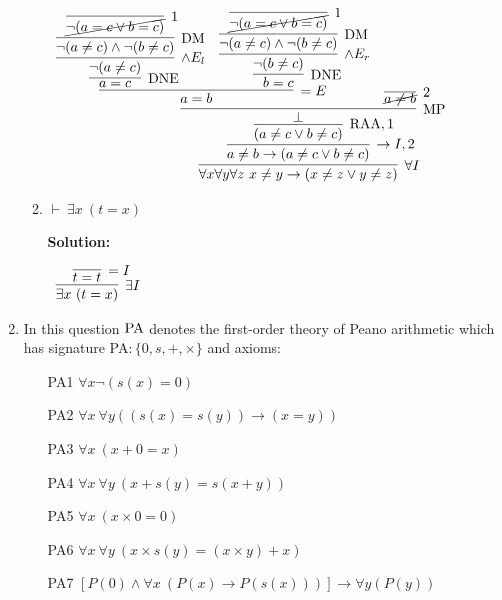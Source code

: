\documentclass[11pt]{report}
\begin{document}
\begin{enumerate}
\begin{enumerate}
		\begin{mdframed}
			\begin{center}
				$\begin{array}{c}
					\infer[\forall I]{\forall x \forall y \forall z \ x \neq y \to (x \neq z \lor y \neq z)}
						{\infer[\to I,2]{a \neq b \to (a \neq c \lor b \neq c)}
							{\infer[\RAA,1]{(a \neq c \lor b \neq c)}
								{\infer[\MP]{\bot}
										{\infer[=E]{a = b}
											{\infer[\DNE]{a=c}
												{\infer[\land E_{l}]{\lnot(a \neq c)}
													{\infer[\DM]{\lnot(a \neq c) \land \lnot(b \neq c)}
														{\infer[1]{\cancel{\lnot (a = c \lor b = c)}}{}}}}
											&
											\infer[\DNE]{b=c}
												{\infer[\land E_{r}]{\lnot(b \neq c)}
													{\infer[\DM]{\lnot(a \neq c) \land \lnot(b \neq c)}
														{\infer[1]{\cancel{\lnot (a = c \lor b = c)}}{}}}}}
										&
										\infer[2]{\cancel{a \neq b}}{}}}}}
				\end{array}$
			\end{center}
		\end{mdframed}
				
		\item $\vdash \ \exists x \ (t = x)$
		
		{\bf Solution:}

		\begin{mdframed}
			\begin{center}
				$\begin{array}{c}
					\infer[\exists I]{\exists x \ (t=x)}
						{\infer[=I]{t=t}{}}
				\end{array}$
			\end{center}
		\end{mdframed}

	\end{enumerate}

	\newpage
	\item 
	
	In this question $\text{PA}$ denotes the first-order theory of Peano arithmetic which has signature PA$: \{0,s,+,\times\}$ and axioms:
	
	\begin{enumerate}
		\item[PA1] $\forall x \lnot(s(x) = 0)$
		\item[PA2] $\forall x \ \forall y ((s(x) = s(y)) \to (x = y))$
		\item[PA3] $\forall x \ (x + 0 = x)$
		\item[PA4] $\forall x \ \forall y \ (x + s(y) = s(x + y))$
		\item[PA5] $\forall x \ (x \times 0 = 0)$
		\item[PA6] $\forall x \ \forall y \ (x \times s(y) = (x \times y) + x)$
		\item[PA7] $[P(0) \land \forall x \ (P(x) \to P(s(x)))] \rightarrow \forall y (P(y))$
	\end{enumerate}	
	

\end{enumerate}
\end{document}
